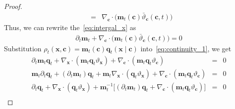 \documentclass{article} %
\begin{document}
\begin{proof}
\begin{eqnarray}
    &= & \nabla_{\mathbf{c}} \cdot \Big( \mathbf{m}_t (\mathbf{c}) \bar{\vartheta}_{\mathbf{c}} (\mathbf{c},t)\Big)
\end{eqnarray}
Thus, we can rewrite the~\eqref{eq:intergal_x} as 
\begin{eqnarray}
    \partial_t \mathbf{m}_t + \nabla_{\mathbf{c}} \cdot \Big( \mathbf{m}_t (\mathbf{c}) \bar{\vartheta}_{\mathbf{c}} (\mathbf{c},t) \Big) = 0 \label{eq:partial_m_t}
\end{eqnarray}
Substitution $\rho_t (\mathbf{x}, \mathbf{c}) = \mathbf{m}_t (\mathbf{c}) \mathbf{q}_t(\mathbf{x} \mid \mathbf{c}) $ into~\eqref{eq:continuity_1}, we get
\begin{eqnarray}
    \partial_t  \mathbf{m}_t \mathbf{q}_t +  \nabla_{\mathbf{x}} \cdot ( \mathbf{m}_t  \mathbf{q}_t\vartheta_{\mathbf{x}}) + \nabla_{\mathbf{c}} \cdot(\mathbf{m}_t\mathbf{q}_t  \vartheta_{\mathbf{c}}) &= &0  \\ \nonumber
    \mathbf{m}_t\partial_t \mathbf{q}_t  +  (\partial_t  \mathbf{m}_t)\mathbf{q}_t +  \mathbf{m}_t\nabla_{\mathbf{x}} \cdot (\mathbf{q}_t  \vartheta_{\mathbf{x}}) + \nabla_{\mathbf{c}} \cdot(\mathbf{m}_t\mathbf{q}_t  \vartheta_{\mathbf{c}})&= &0 \\ \nonumber
    \partial_t \mathbf{q}_t + \nabla_{\mathbf{x}} \cdot (\mathbf{q}_t \vartheta_{\mathbf{x}}) + \mathbf{m}^{-1}_t \big[ (\partial_t  \mathbf{m}_t)\mathbf{q}_t + \nabla_{\mathbf{c}} \cdot (\mathbf{m}_t\mathbf{q}_t  \vartheta_{\mathbf{c}})\big] &= &0 \\ \nonumber
\end{eqnarray}


\end{proof}
\end{document}
